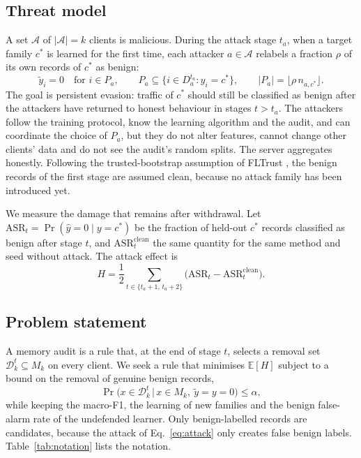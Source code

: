 \documentclass[pdflatex,sn-mathphys-num]{sn-jnl}
\theoremstyle{thmstyleone}
\theoremstyle{thmstylethree}
\begin{document}
\subsection{Threat model}
A set $\mathcal{A}$ of $|\mathcal{A}|=k$ clients is malicious. During the attack stage $t_a$, when a target family $c^\ast$ is learned for the first time, each attacker $a\in\mathcal{A}$ relabels a fraction $\rho$ of its own records of $c^\ast$ as benign:
\begin{equation}
\tilde y_i=0\quad\text{for } i\in P_a,\qquad P_a\subseteq\{i\in D_a^{t_a}: y_i=c^\ast\},\qquad |P_a|=\lfloor\rho\, n_{a,c^\ast}\rfloor .
\label{eq:attack}
\end{equation}
The goal is persistent evasion: traffic of $c^\ast$ should still be classified as benign after the attackers have returned to honest behaviour in stages $t>t_a$. The attackers follow the training protocol, know the learning algorithm and the audit, and can coordinate the choice of $P_a$, but they do not alter features, cannot change other clients' data and do not see the audit's random splits. The server aggregates honestly. Following the trusted-bootstrap assumption of FLTrust \cite{fltrust}, the benign records of the first stage are assumed clean, because no attack family has been introduced yet.

We measure the damage that remains after withdrawal. Let $\mathrm{ASR}_t=\Pr(\hat y=0\mid y=c^\ast)$ be the fraction of held-out $c^\ast$ records classified as benign after stage $t$, and $\mathrm{ASR}_t^{\mathrm{clean}}$ the same quantity for the same method and seed without attack. The attack effect is
\begin{equation}
H=\frac{1}{2}\sum_{t\in\{t_a+1,\,t_a+2\}}\big(\mathrm{ASR}_t-\mathrm{ASR}_t^{\mathrm{clean}}\big).
\label{eq:H}
\end{equation}

\subsection{Problem statement}
A memory audit is a rule that, at the end of stage $t$, selects a removal set $\mathcal{D}_k^t\subseteq M_k$ on every client. We seek a rule that minimises $\mathbb{E}[H]$ subject to a bound on the removal of genuine benign records,
\begin{equation}
\Pr\big(x\in\mathcal{D}_k^t \,\big|\, x\in M_k,\ \tilde y=y=0\big)\leq\alpha ,
\label{eq:problem}
\end{equation}
while keeping the macro-F1, the learning of new families and the benign false-alarm rate of the undefended learner. Only benign-labelled records are candidates, because the attack of Eq.~\eqref{eq:attack} only creates false benign labels. Table~\ref{tab:notation} lists the notation.
\end{document}
